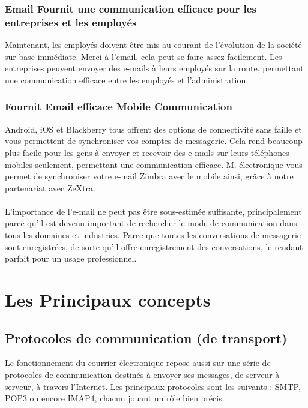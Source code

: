 \documentclass[french]{report}
\begin{document}
\subsubsection{\LARGE Email Fournit une communication efficace pour les entreprises et les employés}
\LARGE Maintenant, les employés doivent être mis au courant de l’évolution de la société sur base immédiate. Merci à l’email, cela peut se faire assez facilement. Les entreprises peuvent envoyer des e-mails à leurs employés sur la route, permettant une communication efficace entre les employés et l’administration.
\subsubsection{\LARGE Fournit Email efficace Mobile Communication}
\LARGE Android, iOS et Blackberry tous offrent des options de connectivité sans faille et vous permettent de synchroniser vos comptes de messagerie. Cela rend beaucoup plus facile pour les gens à envoyer et recevoir des e-mails sur leurs téléphones mobiles seulement, permettant une communication efficace. M. électronique vous permet de synchroniser votre e-mail Zimbra avec le mobile ainsi, grâce à notre partenariat avec ZeXtra.\\ \\
L’importance de l’e-mail ne peut pas être sous-estimée suffisante, principalement parce qu’il est devenu important de rechercher le mode de communication dans tous les domaines et industries. Parce que toutes les conversations de messagerie sont enregistrées, de sorte qu’il offre enregistrement des conversations, le rendant parfait pour un usage professionnel.
\section{\LARGE Les Principaux concepts }
\subsection{\LARGE Protocoles de communication (de transport)}
\LARGE Le fonctionnement du courrier électronique repose aussi sur une série de protocoles de communication destinés à envoyer ses messages, de serveur à serveur, à travers l'Internet. Les principaux protocoles sont les suivants : SMTP, POP3 ou encore IMAP4, chacun jouant un rôle bien précis.\\ \\
\end{document}
